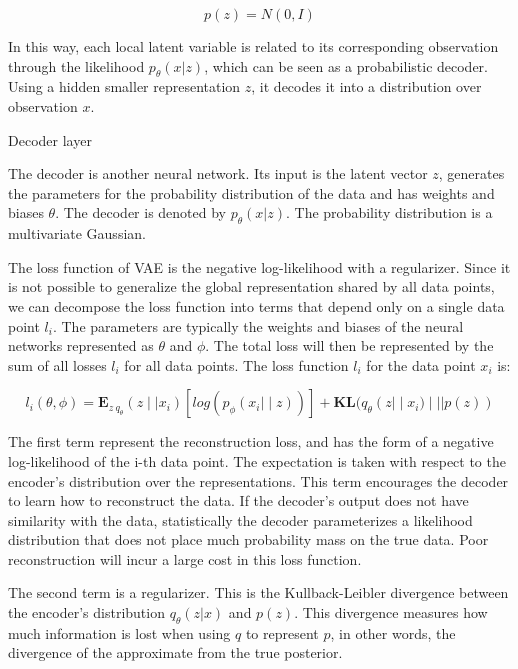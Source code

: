 \documentclass[a4paper, 12pt]{ppgeb}
\makeatletter
\renewcommand{\subsubsection}{\@startsection
{subsubsection}
{3}
{0mm}
{-\baselineskip}
{0.5\baselineskip}
{\bf\sffamily}}
\makeatother
\begin{document}
\begin{equation}
    p(z)=N(0,I) 
    \label{eq1}
\end{equation}


In this way, each local latent variable is related to its corresponding observation through the likelihood \( p_\theta(x|z) \), which can be seen as a probabilistic decoder. Using a hidden smaller representation \(z \), it decodes it into a distribution over observation \(x \).

\subsubsection{Decoder layer}

The decoder is another neural network. Its input is the latent vector \( z \), generates the parameters for the probability distribution of the data and has weights and biases \( \theta \). The decoder is denoted by \( p_\theta (x|z)\). The probability distribution is a multivariate Gaussian.

The loss function of \ac{VAE} is the negative log-likelihood with a regularizer. Since it is not possible to
generalize the global representation shared by all data points, we can decompose the loss function into terms
that depend only on a single data point \( l_i \). The parameters are typically the weights and biases of the
neural networks represented as \( \theta \) and \(\phi\). The total loss will then be represented by the sum of
all losses \( l_i \) for all data points. The loss function \( l_i \) for the data point \( x_i \) is:

\begin{equation}
    l_i(\theta,\phi) = \mathbf{E}_{z~q_\theta}(z ∣| x_i)[log(p_\phi(x_i |∣ z))] +\mathbf{KL} (q_\theta(z |∣ x_i)∣|| p(z))
    \label{eq2}
\end{equation}

The first term represent the reconstruction loss, and has the form of a negative log-likelihood of the i-th data point. The expectation is taken with respect to the encoder’s distribution over the representations. This term encourages the decoder to learn how to reconstruct the data. If the decoder’s output does not have similarity with the data, statistically the decoder parameterizes a likelihood distribution that does not place much probability mass on the true data. Poor reconstruction will incur a large cost in this loss function.

The second term is a regularizer. This is the Kullback-Leibler divergence between the encoder’s distribution \(q_\theta(z|x)\) and \(p(z)\). This divergence measures how much information is lost when using \(q\) to
represent \(p\), in other words, the divergence of the approximate from the true posterior.
\end{document}
